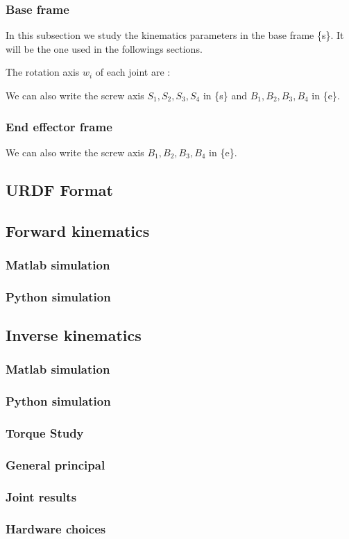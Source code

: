 \subsubsection{Base frame}

In this subsection we study the kinematics parameters in the base frame \{s\}. It will be the one used in the followings sections.

The rotation axis $w_i$ of each joint are : 
\

We can also write the screw axis $S_1,S_2,S_3,S_4$ in \{s\} and $B_1,B_2,B_3,B_4$ in \{e\}.


\subsubsection{End effector frame}

We can also write the screw axis $B_1,B_2,B_3,B_4$ in \{e\}.


\subsection{URDF Format}

\subsection{Forward kinematics}
\subsubsection{Matlab simulation}

\subsubsection{Python simulation}

\subsection{Inverse kinematics}
\subsubsection{Matlab simulation}

\subsubsection{Python simulation}

\subsubsection{Torque Study}
\subsubsection{General principal}

\subsubsection{Joint results}

\subsubsection{Hardware choices}
